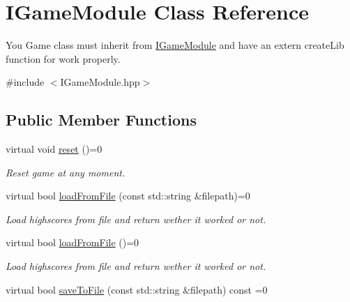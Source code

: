 \hypertarget{class_i_game_module}{}\section{I\+Game\+Module Class Reference}
\label{class_i_game_module}


You Game class must inherit from \hyperlink{class_i_game_module}{I\+Game\+Module} and have an extern create\+Lib function for work properly.  




{\ttfamily \#include $<$I\+Game\+Module.\+hpp$>$}

\subsection*{Public Member Functions}
\begin{DoxyCompactItemize}
\item 
\mbox{\label{class_i_game_module_a116b1a9109725f6e8a52479d8126bc2c}} 
virtual void \hyperlink{class_i_game_module_a116b1a9109725f6e8a52479d8126bc2c}{reset} ()=0
\begin{DoxyCompactList}\small\item\em Reset game at any moment. \end{DoxyCompactList}\item 
\mbox{\label{class_i_game_module_afc7f0c9a48c885ee920dbfea99ae91d9}} 
virtual bool \hyperlink{class_i_game_module_afc7f0c9a48c885ee920dbfea99ae91d9}{load\+From\+File} (const std\+::string \&filepath)=0
\begin{DoxyCompactList}\small\item\em Load highscores from file and return wether it worked or not. \end{DoxyCompactList}\item 
\mbox{\label{class_i_game_module_a0fd38da232d3d362f64fe87274391add}} 
virtual bool \hyperlink{class_i_game_module_a0fd38da232d3d362f64fe87274391add}{load\+From\+File} ()=0
\begin{DoxyCompactList}\small\item\em Load highscores from file and return wether it worked or not. \end{DoxyCompactList}\item 
virtual bool \hyperlink{class_i_game_module_a03f9bf4061f7f52356a768f984c372ae}{save\+To\+File} (const std\+::string \&filepath) const =0

\end{DoxyCompactItemize}
